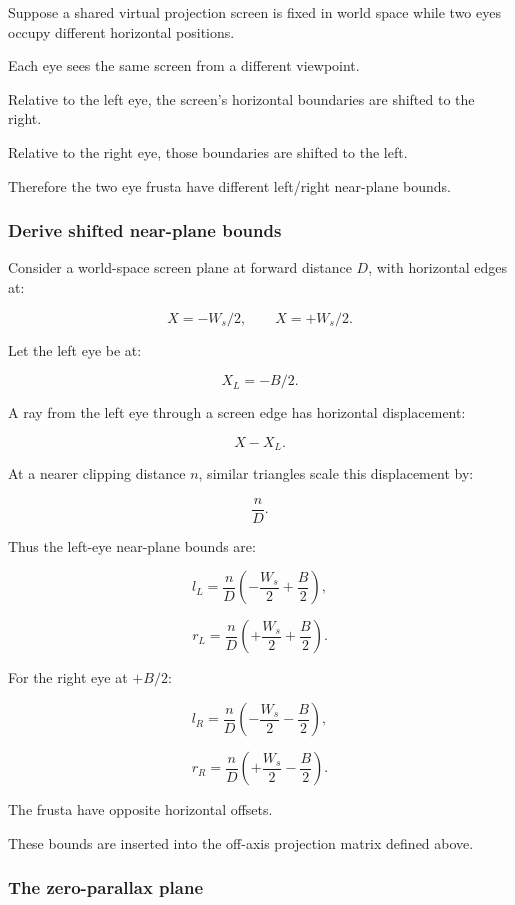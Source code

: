 Suppose a shared virtual projection screen is fixed in world space while two eyes occupy different horizontal positions.

Each eye sees the same screen from a different viewpoint.

Relative to the left eye, the screen's horizontal boundaries are shifted to the right.

Relative to the right eye, those boundaries are shifted to the left.

Therefore the two eye frusta have different left/right near-plane bounds.

\subsubsection{Derive shifted near-plane bounds}\label{derive-shifted-near-plane-bounds}

Consider a world-space screen plane at forward distance \(D\), with horizontal edges at:

\[ X=-W_s/2,\qquad X=+W_s/2. \]

Let the left eye be at:

\[ X_L=-B/2. \]

A ray from the left eye through a screen edge has horizontal displacement:

\[ X-X_L. \]

At a nearer clipping distance \(n\), similar triangles scale this displacement by:

\[ \frac nD. \]

Thus the left-eye near-plane bounds are:

\[ \boxed{ l_L=\frac nD\left(-\frac{W_s}{2}+\frac B2\right), } \]

\[ \boxed{ r_L=\frac nD\left(+\frac{W_s}{2}+\frac B2\right). } \]

For the right eye at \(+B/2\):

\[ \boxed{ l_R=\frac nD\left(-\frac{W_s}{2}-\frac B2\right), } \]

\[ \boxed{ r_R=\frac nD\left(+\frac{W_s}{2}-\frac B2\right). } \]

The frusta have opposite horizontal offsets.

These bounds are inserted into the off-axis projection matrix defined above.

\subsubsection{The zero-parallax plane}\label{the-zero-parallax-plane}

